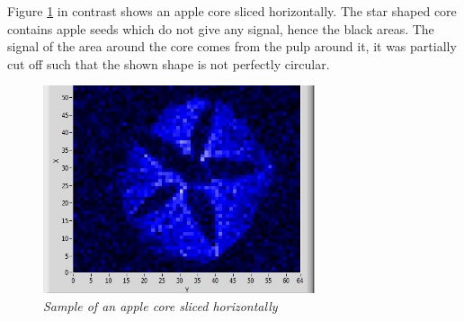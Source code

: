 \noindent
Figure \ref{fig:18} in contrast shows an apple core sliced horizontally. The star shaped core contains apple seeds which do not give any signal, hence the black areas. The signal of the area around the core comes from the pulp around it, it was partially cut off such that the shown shape is not perfectly circular.
\begin{figure}[h]
	\includegraphics[width=80mm]{Apple}
	\centering
	\caption{\itshape Sample of an apple core sliced horizontally}
	\label{fig:18}
\end{figure}